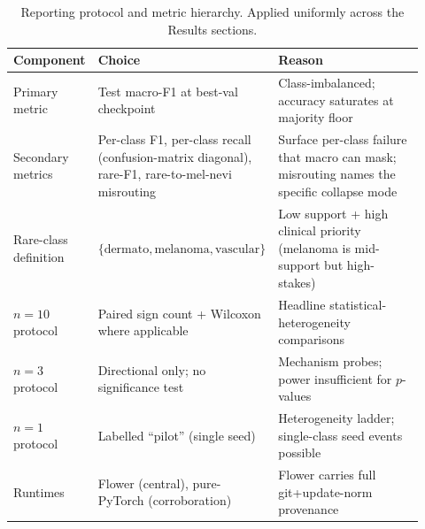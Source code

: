 \documentclass[11pt,a4paper]{report}
\begin{document}
\begin{table}[H]
\centering
\small
\caption{Reporting protocol and metric hierarchy. Applied uniformly across the
Results sections.}
\label{tab:reporting-protocol}
\begin{tabular}{p{0.20\linewidth} p{0.32\linewidth} p{0.40\linewidth}}
\toprule
Component               & Choice                                       & Reason \\
\midrule
Primary metric          & Test macro-F1 at best-val checkpoint         & Class-imbalanced; accuracy saturates at majority floor \\
Secondary metrics       & Per-class F1, per-class recall (confusion-matrix diagonal), rare-F1, rare-to-mel-nevi misrouting & Surface per-class failure that macro can mask; misrouting names the specific collapse mode \\
Rare-class definition   & $\{\text{dermato}, \text{melanoma}, \text{vascular}\}$ & Low support + high clinical priority (melanoma is mid-support but high-stakes) \\
$n = 10$ protocol       & Paired sign count + Wilcoxon where applicable & Headline statistical-heterogeneity comparisons \\
$n = 3$ protocol        & Directional only; no significance test       & Mechanism probes; power insufficient for $p$-values \\
$n = 1$ protocol        & Labelled ``pilot'' (single seed)             & Heterogeneity ladder; single-class seed events possible \\
Runtimes                & Flower (central), pure-PyTorch (corroboration) & Flower carries full git+update-norm provenance \\
\bottomrule
\end{tabular}
\end{table}
\end{document}
